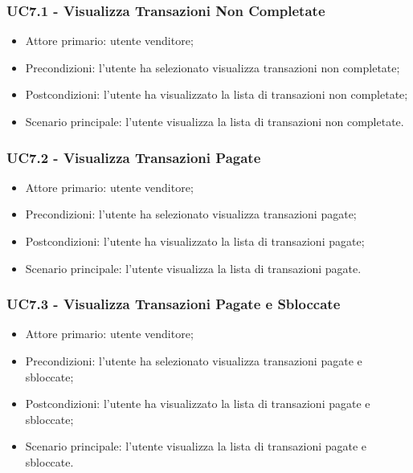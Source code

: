 \subsubsection{UC7.1 - Visualizza Transazioni Non Completate}

\begin{itemize}
    \item Attore primario: utente venditore;
    \item Precondizioni: l'utente ha selezionato visualizza transazioni non completate;
    \item Postcondizioni: l'utente ha visualizzato la lista di transazioni non completate;
    \item Scenario principale: l'utente visualizza la lista di transazioni non completate.
\end{itemize}

\subsubsection{UC7.2 - Visualizza Transazioni Pagate}

\begin{itemize}
    \item Attore primario: utente venditore;
    \item Precondizioni: l'utente ha selezionato visualizza transazioni pagate;
    \item Postcondizioni: l'utente ha visualizzato la lista di transazioni pagate;
    \item Scenario principale: l'utente visualizza la lista di transazioni pagate.
\end{itemize}

\subsubsection{UC7.3 - Visualizza Transazioni Pagate e Sbloccate}

\begin{itemize}
    \item Attore primario: utente venditore;
    \item Precondizioni: l'utente ha selezionato visualizza transazioni pagate e sbloccate;
    \item Postcondizioni: l'utente ha visualizzato la lista di transazioni pagate e sbloccate;
    \item Scenario principale: l'utente visualizza la lista di transazioni pagate e sbloccate.
\end{itemize}
\clearpage
